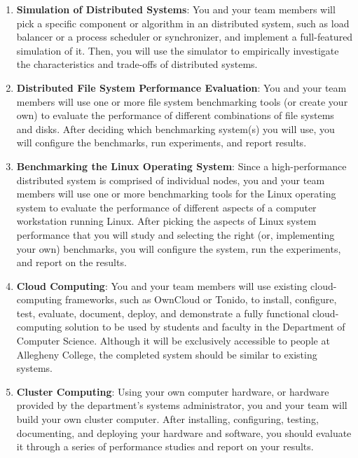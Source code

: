 \begin{enumerate}

  \item {\bf Simulation of Distributed Systems}: You and your team members will pick a specific component or algorithm
    in an distributed system, such as load balancer or a process scheduler or synchronizer, and implement a
    full-featured simulation of it. Then, you will use the simulator to empirically investigate the characteristics and
    trade-offs of distributed systems.

  \item {\bf Distributed File System Performance Evaluation}: You and your team members will use one or more file system
    benchmarking tools (or create your own) to evaluate the performance of different combinations of file systems and
    disks.  After deciding which benchmarking system(s) you will use, you will configure the benchmarks, run
    experiments, and report results.

  \item {\bf Benchmarking the Linux Operating System}: Since a high-performance distributed system is comprised of
    individual nodes, you and your team members will use one or more benchmarking tools for the Linux operating system
    to evaluate the performance of different aspects of a computer workstation running Linux.  After picking the aspects
    of Linux system performance that you will study and selecting the right (or, implementing your own) benchmarks, you
    will configure the system, run the experiments, and report on the results.

  \item {\bf Cloud Computing}: You and your team members will use existing cloud-computing frameworks, such as OwnCloud
    or Tonido, to install, configure, test, evaluate, document, deploy, and demonstrate a fully functional
    cloud-computing solution to be used by students and faculty in the Department of Computer Science. Although it will
    be exclusively accessible to people at Allegheny College, the completed system should be similar to existing
    systems.

  \item {\bf Cluster Computing}: Using your own computer hardware, or hardware provided by the department's systems
    administrator, you and your team will build your own cluster computer.  After installing, configuring, testing,
    documenting, and deploying your hardware and software, you should evaluate it through a series of performance
    studies and report on your results.


\end{enumerate}
